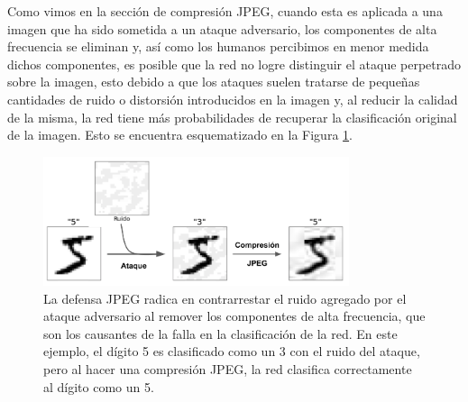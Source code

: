 Como vimos en la sección de compresión JPEG, cuando esta es aplicada a una imagen que ha sido sometida a un ataque adversario, los componentes de alta frecuencia se eliminan y, así como los humanos percibimos en menor medida dichos componentes, es posible que la red no logre distinguir el ataque perpetrado sobre la imagen, esto debido a que los ataques suelen tratarse de pequeñas cantidades de ruido o distorsión introducidos en la imagen y, al reducir la calidad de la misma, la red tiene más probabilidades de recuperar la clasificación original de la imagen. Esto se encuentra esquematizado en la Figura \ref{jpegexample}.

\begin{figure}[h!]
    \centering
    \includegraphics[width=0.8\textwidth]{images/jpeg/jpegdefense_example.png}
    \caption{La defensa JPEG radica en contrarrestar el ruido agregado por el ataque adversario al remover los componentes de alta frecuencia, que son los causantes de la falla en la clasificación de la red. En este ejemplo, el dígito 5 es clasificado como un 3 con el ruido del ataque, pero al hacer una compresión JPEG, la red clasifica correctamente al dígito como un 5.}
    \label{jpegexample}
\end{figure}

